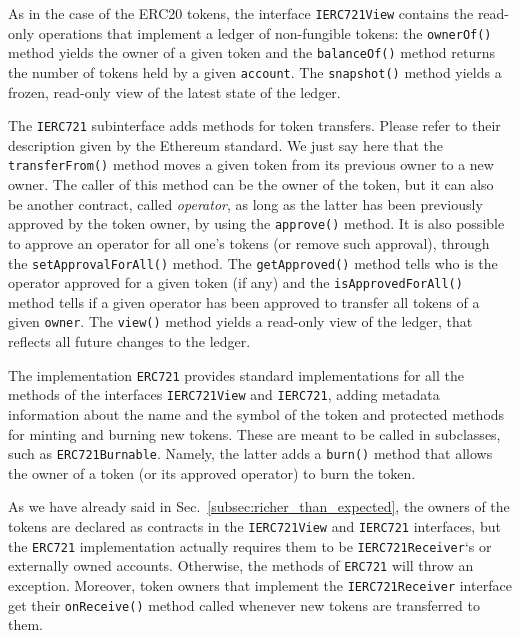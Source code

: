 As in the case of the ERC20 tokens, the interface
\texttt{IERC721View} contains
the read-only operations that implement a ledger of non-fungible
tokens: the \texttt{ownerOf()} method yields the owner of a given token and
the \texttt{balanceOf()} method returns the number of tokens held by a given \texttt{account}.
The \texttt{snapshot()} method
yields a frozen, read-only view of the latest state of the ledger.

The \texttt{IERC721} subinterface
adds methods for token transfers.
Please refer to their description given by the Ethereum standard.
We just say here that
the \texttt{transferFrom()} method moves a given token from its previous
owner to a new owner. The caller of this method can be the owner of the
token, but it can also be another contract, called \emph{operator},
as long as the latter has
been previously approved by the token owner, by using the
\texttt{approve()} method. It is also possible to approve an operator for all
one's tokens (or remove such approval), through the \texttt{setApprovalForAll()} method.
The \texttt{getApproved()} method tells who is the operator approved for a given token
(if any) and the \texttt{isApprovedForAll()} method tells if a given operator has been
approved to transfer all tokens of a given \texttt{owner}. The \texttt{view()} method
yields a read-only view of the ledger, that reflects all future changes to the ledger.

The implementation \texttt{ERC721} provides standard implementations for all the methods
of the interfaces \texttt{IERC721View} and \texttt{IERC721}, adding metadata information about the name and the
symbol of the token and protected methods for minting and burning
new tokens. These are meant to be called in subclasses, such as
\texttt{ERC721Burnable}. Namely,
the latter adds a \texttt{burn()} method that allows the owner of a token
(or its approved operator) to burn the token.

As we have already said in Sec.~\ref{subsec:richer_than_expected},
the owners of the tokens are declared as contracts
in the \texttt{IERC721View} and \texttt{IERC721} interfaces, but the \texttt{ERC721} implementation
actually requires them to be
\texttt{IERC721Receiver}`s
or externally owned accounts.
Otherwise, the methods of \texttt{ERC721} will throw an exception.
Moreover, token owners that implement the \texttt{IERC721Receiver} interface
get their \texttt{onReceive()} method called whenever new tokens are transferred to them.

